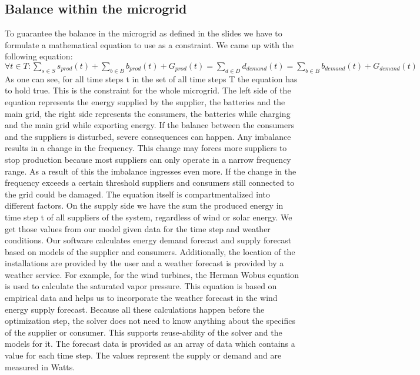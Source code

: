 \subsection{Balance within the microgrid}
To guarantee the balance in the microgrid as defined in the slides we have to formulate a mathematical equation to use as a constraint.
We came up with the following equation:\\
$\forall t \in T: \sum_{s \in S}{s_{prod}(t)} + \sum_{b \in B}{b_{prod}(t)} + G_{prod}(t) = \sum_{d \in D}{d_{demand}(t)} = \sum_{b \in B}{b_{demand}(t)} + G_{demand}(t)$\\
As one can see, for all time steps t in the set of all time steps T the equation has to hold true. 
This is the constraint for the whole microgrid. The left side of the equation represents the energy supplied by the supplier, the batteries and the main grid, the right side represents the consumers, the batteries while charging and the main grid while exporting energy. If the balance between the consumers and the suppliers is disturbed, severe consequences can happen. Any imbalance results in a change in the frequency. This change may forces more suppliers to stop production because most suppliers can only operate in a narrow frequency range. As a result of this the imbalance ingresses even more. If the change in the frequency exceeds a certain threshold suppliers and consumers still connected to the grid could be damaged. 
The equation itself is compartmentalized into different factors.
On the supply side we have the sum the produced energy in time step t of all suppliers of the system, regardless of wind or solar energy.
We get those values from our model given data for the time step and weather conditions. Our software calculates energy demand forecast and supply forecast based on models of the supplier and consumers. Additionally, the location of the installations are provided by the user and a weather forecast is provided by a weather service. For example, for the wind turbines, the Herman Wobus equation is used to calculate the saturated vapor pressure. This equation is based on empirical data and helps us to incorporate the weather forecast in the wind energy supply forecast. Because all these calculations happen before the optimization step, the solver does not need to know anything about the specifics of the supplier or consumer. This supports reuse-ability of the solver and the models for it. The forecast data is provided as an array of data which contains a value for each time step. The values represent the supply or demand and are measured in Watts. 
